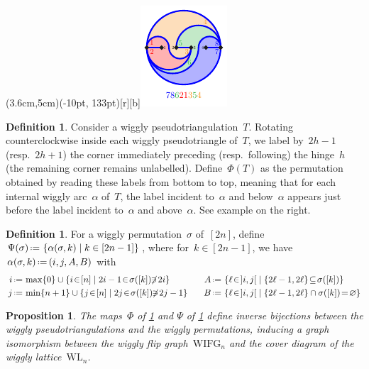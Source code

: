 \documentclass[submission]{FPSAC2025}
\newtheorem{proposition}[theorem]{Proposition}
\theoremstyle{definition}
\newtheorem{definition}[theorem]{Definition}
\newcommand{\set}[2]{\left\{ #1 \;\middle|\; #2 \right\}} %
\newcommand{\eqdef}{\mbox{\,\raisebox{0.2ex}{\scriptsize\ensuremath{\mathrm:}}\ensuremath{=}\,}} %
\newcommand{\wigglyIncreasingFlipGraph}{\mathrm{WIFG}} %
\newcommand{\wigglyLattice}{\mathrm{WL}} %
\begin{document}

\parpic(3.6cm,5cm)(-10pt, 133pt)[r][b]{\includegraphics[scale=2]{bijection}}{
\begin{definition}
\label{def:bijection1}
Consider a wiggly pseudotriangulation~$T$.
Rotating counterclockwise inside each wiggly pseudotriangle of~$T$, we label by~$2h-1$ (resp.~$2h+1$) the corner immediately preceding (resp.~following) the hinge~$h$ (the remaining corner remains unlabelled).
Define~$\Phi(T)$ as the permutation obtained by reading these labels from bottom to top, meaning that for each internal wiggly arc~$\alpha$ of~$T$, the label incident to~$\alpha$ and below~$\alpha$ appears just before the label incident to~$\alpha$ and above~$\alpha$.
See example on the right.
\end{definition}

\begin{definition}
\label{def:bijection2}
For a wiggly permutation~$\sigma$ of~$[2n]$, define~$\Psi(\sigma) \eqdef \set{\alpha(\sigma, k)}{k \in [2n-1]}$, where for~$k \in [2n-1]$, we have~$\alpha(\sigma, k) \eqdef ( i, j, A, B)$ with
\begin{alignat*}{3}
i & \eqdef \max \{0\} \cup \set{i \!\in\! [n]}{2i-1 \!\in\! \sigma([k]) \!\!\not\ni\! 2i} \quad &
A & \eqdef \set{\ell \!\in\! {]i,j[}}{\{2\ell-1, 2\ell\} \!\subseteq\! \sigma([k])} \\
j & \eqdef \min \{n+1\} \cup \set{j \!\in\! [n]}{2j \!\in\! \sigma([k]) \!\!\not\ni\! 2j-1} \;\;\; &
B & \eqdef \set{\ell \!\in\! {]i,j[}}{\{2\ell-1, 2\ell\} \cap \sigma([k]) \!=\! \varnothing}
\end{alignat*}
\end{definition}
}

\begin{proposition}
\label{prop:bijection}
The maps~$\Phi$ of \cref{def:bijection1} and $\Psi$ of \cref{def:bijection2} define inverse bijections between the wiggly pseudotriangulations and the wiggly permutations, inducing a graph isomorphism between the wiggly flip graph~$\wigglyIncreasingFlipGraph_n$ and the cover diagram of the wiggly lattice~$\wigglyLattice_n$.
\end{proposition}
\end{document}

